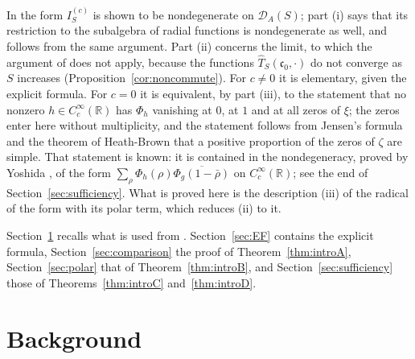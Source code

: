 \documentclass[11pt]{amsart}
\theoremstyle{remark}
\numberwithin{equation}{section}
\newcommand{\R}{\mathbb R}
\newcommand{\DA}{\mathcal D_A}
\newcommand{\cz}{\mathfrak c_0}
\begin{document}
In \cite{P43} the form $I^{(c)}_S$ is shown to be nondegenerate on
$\DA(S)$; part (i) says that its restriction to the subalgebra of radial
functions is nondegenerate as well, and follows from the same argument.
Part (ii) concerns the limit, to which the argument of \cite{P43} does not
apply, because the functions $\widehat T_S(\cz,\cdot)$ do not converge as
$S$ increases (Proposition~\ref{cor:noncommute}).  For $c\ne0$ it is
elementary, given the explicit formula.  For $c=0$ it is equivalent, by
part (iii), to the statement that no nonzero $h\in C_c^\infty(\R)$ has
$\Phi_h$ vanishing at $0$, at $1$ and at all zeros of $\xi$; the zeros enter
here without multiplicity, and the statement follows from Jensen's formula
and the theorem of Heath-Brown \cite{HeathBrown} that a positive proportion
of the zeros of $\zeta$ are simple.  That statement is known: it is
contained in the nondegeneracy, proved by Yoshida
\cite[Proposition~2 and its Corollary]{Yoshida}, of the form
$\sum_\rho\Phi_h(\rho)\overline{\Phi_g(1-\bar\rho)}$ on $C_c^\infty(\R)$;
see the end of Section~\ref{sec:sufficiency}.  What is proved here is the
description (iii) of the radical of the form with its polar term, which
reduces (ii) to it.

Section~\ref{sec:carrier} recalls what is used from \cite{P43,P44}.
Section~\ref{sec:EF} contains the explicit formula,
Section~\ref{sec:comparison} the proof of Theorem~\ref{thm:introA},
Section~\ref{sec:polar} that of Theorem~\ref{thm:introB}, and
Section~\ref{sec:sufficiency} those of Theorems~\ref{thm:introC}
and~\ref{thm:introD}.

\section{Background}
\label{sec:carrier}
\end{document}
